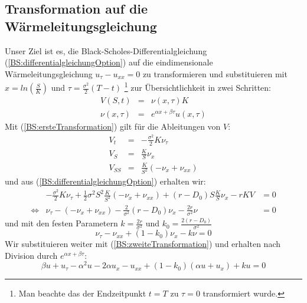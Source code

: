 \subsection{Transformation auf die Wärmeleitungsgleichung}    %
\label{cha:Transformation}                                    %
Unser Ziel ist es, die Black-Scholes-Differentialgleichung (\ref{BS:differentialgleichungOption}) auf die eindimensionale Wärmeleitungsgleichung $u_{\tau} - u_{xx} = 0$ zu transformieren und substituieren mit $x = ln\left(\frac{S}{K}\right)$ und $\tau = \frac{\sigma^2}{2}\left(T-t\right)$ \footnote{Man beachte das der Endzeitpunkt $t=T$ zu $\tau = 0$ transformiert wurde.} zur Übersichtlichkeit in zwei Schritten:
\begin{eqnarray}
V(S,t) & = & \nu (x,\tau)K \label{BS:ersteTransformation} \\
\nu (x,\tau) & = & e^{\alpha x + \beta \tau}u(x,\tau) \label{BS:zweiteTransformation}
\end{eqnarray}
Mit (\ref{BS:ersteTransformation}) gilt für die Ableitungen von $V$: 
\[\begin{array}{rcl}
V_t & = & -\frac{\sigma^2}{2}K\nu _{\tau} \\
V_S & = & \frac{K}{S}\nu _x \\
V_{SS} & = & \frac{K}{S^2}\left(-\nu _x + \nu _{xx}\right)
\end{array}\]
und aus (\ref{BS:differentialgleichungOption}) erhalten wir:
\begin{eqnarray*}
& -\frac{\sigma^2}{2}K\nu _{\tau} + \frac{1}{2}\sigma^2S^2\frac{K}{S^2}\left(-\nu _x + \nu _{xx}\right) + \left(r-D_0\right)S\frac{K}{S}\nu _x - rKV & = 0 \\
\Leftrightarrow & \nu _{\tau} - \left(-\nu _{x} + \nu _{xx}\right) - \frac{2}{\sigma^2}\left(r-D_0\right)\nu _{x} - \frac{2r}{\sigma^2}\nu & = 0     
\end{eqnarray*}
und mit den festen Parametern $k=\frac{2r}{\sigma^2}$ und $k_0 = \frac{2\left(r-D_0\right)}{\sigma^2}$
\begin{equation*}
\nu _{\tau} - \nu _{xx} + \left(1-k_0\right)\nu _{x} - k\nu  = 0 
\end{equation*}
Wir substituieren weiter mit (\ref{BS:zweiteTransformation}) und erhalten nach Division durch $e^{\alpha x + \beta \tau}$:
\begin{equation*}
\beta u + u_{\tau} - \alpha^2u - 2\alpha u_{x} - u_{xx} + \left(1-k_0\right)\left(\alpha u + u_x\right) + ku = 0
\end{equation*}
